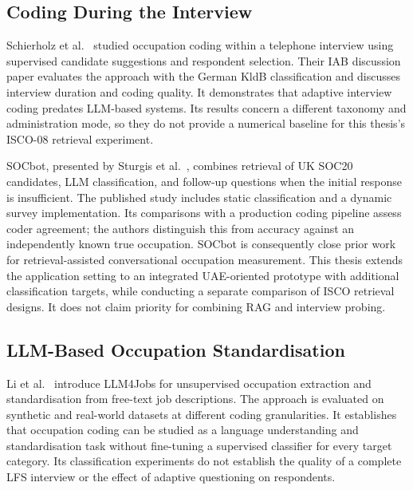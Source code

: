 \subsection{Coding During the Interview}

Schierholz et al.~\cite{schierholz2016interview} studied occupation coding
within a telephone interview using supervised candidate suggestions and
respondent selection. Their IAB discussion paper evaluates the approach
with the German KldB classification and discusses interview duration and
coding quality. It demonstrates that adaptive interview coding predates
LLM-based systems. Its results concern a different taxonomy and
administration mode, so they do not provide a numerical baseline for this
thesis's ISCO-08 retrieval experiment.

SOCbot, presented by Sturgis et al.~\cite{kochar2025socbot}, combines
retrieval of UK SOC20 candidates, LLM classification, and follow-up
questions when the initial response is insufficient. The published study
includes static classification and a dynamic survey implementation.
Its comparisons with a production coding pipeline assess coder agreement;
the authors distinguish this from accuracy against an independently known
true occupation. SOCbot is consequently close prior work for
retrieval-assisted conversational occupation measurement. This thesis
extends the application setting to an integrated UAE-oriented prototype
with additional classification targets, while conducting a separate
comparison of ISCO retrieval designs. It does not claim priority for
combining RAG and interview probing.

\subsection{LLM-Based Occupation Standardisation}

Li et al.~\cite{anon2025llm4jobs} introduce LLM4Jobs for unsupervised
occupation extraction and standardisation from free-text job descriptions.
The approach is evaluated on synthetic and real-world datasets at
different coding granularities. It establishes that occupation coding can
be studied as a language understanding and standardisation task without
fine-tuning a supervised classifier for every target category.
Its classification experiments do not establish the quality of a complete
LFS interview or the effect of adaptive questioning on respondents.

